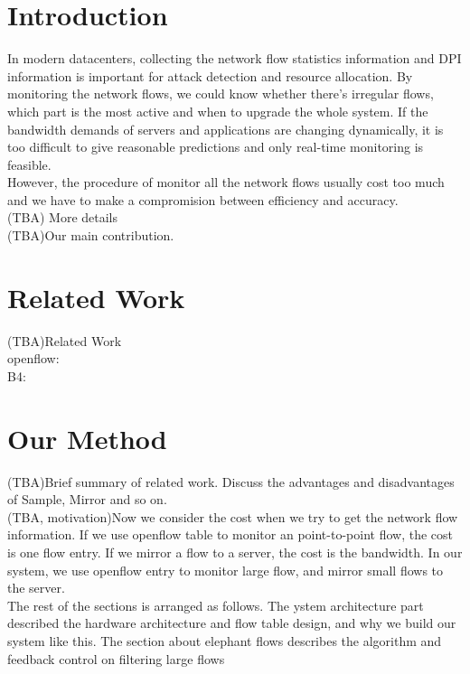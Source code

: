 \documentclass{acm_proc_article-sp}
\begin{document}


\section{Introduction}
In modern datacenters, collecting the network flow statistics information and DPI information is important for attack detection and resource allocation. By monitoring the network flows, we could know whether there's irregular flows, which part is the most active and when to upgrade the whole system. If the bandwidth demands of servers and applications are changing dynamically, it is too difficult to give reasonable predictions and only real-time monitoring is feasible.\\
However, the procedure of monitor all the network flows usually cost too much and we have to make a compromision between efficiency and accuracy.\\ 
(TBA) More details\\
(TBA)Our main contribution.\\


\section{Related Work}
(TBA)Related Work\\
openflow: \cite{openflow}\\
B4: \cite{google-b4}\\


\section{Our Method}
(TBA)Brief summary of related work. Discuss the advantages and disadvantages of Sample, Mirror and so on.\\
(TBA, motivation)Now we consider the cost when we try to get the network flow information. If we use openflow table to monitor an point-to-point flow, the cost is one flow entry. If we mirror a flow to a server, the cost is the bandwidth. In our system, we use openflow entry to monitor large flow, and mirror small flows to the server.\\
The rest of the sections is arranged as follows. The ystem architecture part described the hardware architecture and flow table design, and why we build our system like this.  The section about elephant flows describes the algorithm and feedback control on filtering large flows\\
\end{document}

